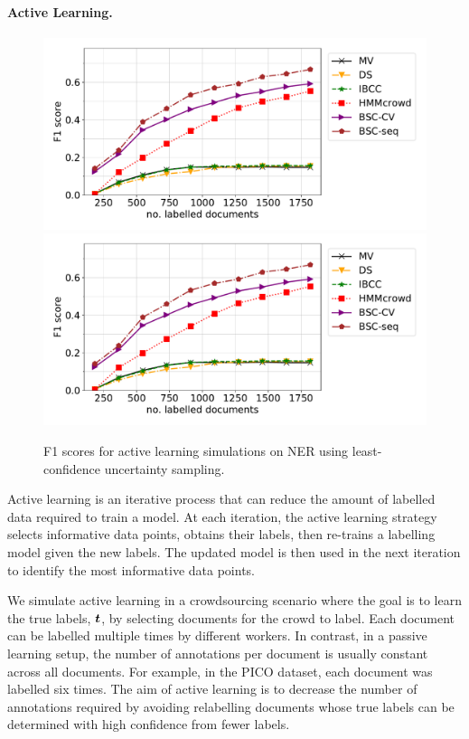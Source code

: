 \paragraph{Active Learning. }
 \begin{figure}[h]
 \centering
   \includegraphics[width=0.3\columnwidth, clip=True, trim=530 160 20 20]{figures/NER_AL/pool/plot_F1-score.pdf}
      \includegraphics[width=0.9\columnwidth, clip=True, trim=40 22 190 15]{figures/NER_AL/pool/plot_F1-score.pdf}
 \caption{F1 scores for active learning simulations on NER using least-confidence 
 uncertainty sampling.
 }
 \label{fig:alner}
 \end{figure}
 Active learning is an iterative process that can reduce the amount of labelled
  data required to train a model.
  At each iteration, the active learning strategy selects informative data points,
  obtains their labels, 
  then re-trains a labelling model given the new labels.
 The updated model is then used in the next iteration to identify the most
 informative data points.  
 
  We simulate active learning in a crowdsourcing scenario
  where the goal is to learn the true labels,
  $\boldsymbol t$, by selecting documents for the crowd to label.
  Each document can be labelled multiple times by different workers.
  In contrast, in a passive learning setup, the number of annotations per document is 
  usually constant across all documents. 
  For example, in the PICO dataset, each
  document was labelled six times.
  The aim of active learning is to decrease the number of annotations required
  by avoiding relabelling documents whose true labels can be determined with  high confidence from fewer labels.
  
